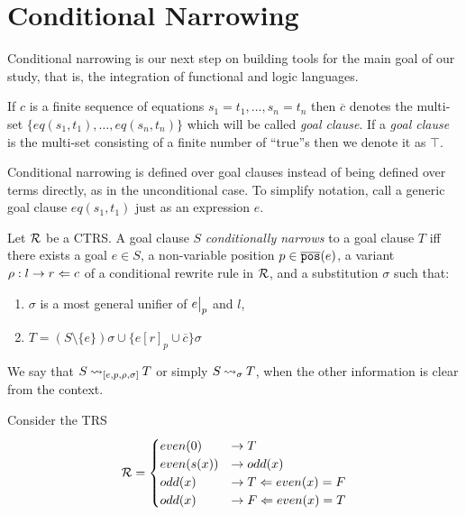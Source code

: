 \section{Conditional Narrowing}
Conditional narrowing is our next step on building tools for the main goal of our study, that is, the integration of functional and logic languages.

\begin{definition}
	If $c$ is a finite sequence of equations $s_1 = t_1, \dots, s_n = t_n$ then $\overline{c}$ denotes the multi-set $\{ eq(s_1, t_1), \dots, eq(s_n, t_n) \}$ which will be called \textit{goal clause}. If a \textit{goal clause} is the multi-set consisting of a finite number of ``true''s then we denote it as $\top$.
\end{definition}

Conditional narrowing is defined over goal clauses instead of being defined over terms directly, as in the unconditional case. To simplify notation, call a generic goal clause $eq(s_1, t_1)$ just as an expression $e$.

\begin{definition}
	Let $\mathcal{R}$ be a CTRS. A goal clause $S$ \textit{conditionally narrows} to a goal clause $T$ iff there exists a goal $e \in S$, a non-variable position $p \in \overline{\mathtt{pos}}(e)$, a variant $\rho : l \rightarrow r \Leftarrow c$ of a conditional rewrite rule in $\mathcal{R}$, and a substitution $\sigma$ such that:
	\begin{enumerate}
		\item $\sigma$ is a most general unifier of $\restr{e}{p}$ and $l$,
		\item $T = (S \setminus \{e\})\sigma \cup \{ e[r]_p \cup \overline{c} \}\sigma$
	\end{enumerate}
	We say that $S \mathbin{\rightsquigarrow}_{[e, p, \rho, \sigma]} T$ or simply $S \mathbin{\rightsquigarrow}_\sigma T$, when the other information is clear from the context.
\end{definition}

\begin{example}
	Consider the TRS
	\begin{displaymath}
		\mathcal{R} =
		\begin{cases}
			even(0)    & \rightarrow T                        \\
			even(s(x)) & \rightarrow odd(x)                   \\
			odd(x)     & \rightarrow T \Leftarrow even(x) = F \\
			odd(x)     & \rightarrow F \Leftarrow even(x) = T
		\end{cases}
	\end{displaymath}
\end{example}

